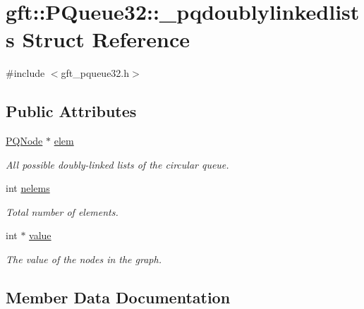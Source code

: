 \hypertarget{structgft_1_1PQueue32_1_1__pqdoublylinkedlists}{}\section{gft\+:\+:P\+Queue32\+:\+:\+\_\+pqdoublylinkedlists Struct Reference}
\label{structgft_1_1PQueue32_1_1__pqdoublylinkedlists}


{\ttfamily \#include $<$gft\+\_\+pqueue32.\+h$>$}

\subsection*{Public Attributes}
\begin{DoxyCompactItemize}
\item 
\hyperlink{namespacegft_1_1PQueue32_ae52de18ce37cbf998885ae2ea5843494}{P\+Q\+Node} $\ast$ \hyperlink{structgft_1_1PQueue32_1_1__pqdoublylinkedlists_aad37a02a88a1d2aad5428a0bd83a42fb}{elem}
\begin{DoxyCompactList}\small\item\em All possible doubly-\/linked lists of the circular queue. \end{DoxyCompactList}\item 
int \hyperlink{structgft_1_1PQueue32_1_1__pqdoublylinkedlists_aac1cff87642f59107cbec2ef52c8be11}{nelems}
\begin{DoxyCompactList}\small\item\em Total number of elements. \end{DoxyCompactList}\item 
int $\ast$ \hyperlink{structgft_1_1PQueue32_1_1__pqdoublylinkedlists_a97c614bd8679dc49d6134f1380e173ef}{value}
\begin{DoxyCompactList}\small\item\em The value of the nodes in the graph. \end{DoxyCompactList}\end{DoxyCompactItemize}


\subsection{Member Data Documentation}
